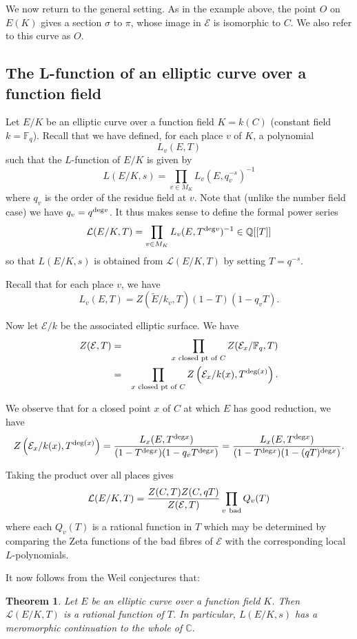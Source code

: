 \documentclass[12pt]{amsart}
\numberwithin{equation}{section}
\newtheorem{theorem}[equation]{Theorem}
\theoremstyle{remark}
\theoremstyle{definition}
\theoremstyle{definition}
\theoremstyle{definition}
\theoremstyle{definition}
\theoremstyle{definition}
\theoremstyle{definition}
\theoremstyle{definition}
\begin{document}
We now return to the general setting. As in the example above, the point $O$ on $E(K)$ gives a section $\sigma$ to $\pi$, whose image in $\mathcal{E}$ is isomorphic to  $C$. We also refer to this curve as $O$. 

\subsection{The L-function of an elliptic curve over a function field}

Let $E/K$ be an elliptic curve over a function field $K=k(C)$ (constant field $k=\mathbb{F}_q$). Recall that we have defined, for each place $v$ of $K$, a polynomial
\[L_v(E,T)\]
such that the $L$-function of $E/K$ is given by
\[L(E/K,s)=\prod_{v\in M_K}L_v(E,q_v^{-s})^{-1}\]
where $q_v$ is the order of the residue field at $v$. 
Note that (unlike the number field case) we have $q_v=q^{\textup{deg}v}$. It thus makes sense to define the formal power series
\[\mathcal{L}(E/K,T)=\prod_{v\in M_K}L_v(E,T^{\textup{deg}v})^{-1}\in \mathbb{Q}[[T]]\]
so that $L(E/K,s)$ is obtained from $\mathcal{L}(E/K,T)$ by setting $T=q^{-s}$. 

Recall that for each place $v$, we have
\[L_v(E,T)=Z(\tilde{E}/k_v,T)(1-T)(1-q_vT).\]

Now let $\mathcal{E}/k$ be the associated elliptic surface. We have
\begin{eqnarray*}
Z(\mathcal{E},T)&=&\prod_{x \textup{ closed pt of }C}Z(\mathcal{E}_x/\mathbb{F}_q,T)\\
&=&\prod_{x \textup{ closed pt of }C}Z\left(\mathcal{E}_x/k(x),T^{\textup{deg}(x)}\right).
\end{eqnarray*}

We observe that for a closed point $x$ of $C$ at which $E$ has good reduction, we have
\[Z\left(\mathcal{E}_x/k(x),T^{\textup{deg}(x)}\right)=\frac{L_x(E,T^{\textup{deg}x})}{(1-T^{\textup{deg}x})(1-q_vT^{\textup{deg}x})}=\frac{L_x(E,T^{\textup{deg}x})}{(1-T^{\textup{deg}x})(1-(qT)^{\textup{deg}x})}.\]

Taking the product over all places gives
\[\mathcal{L}(E/K,T)=\frac{Z(C,T)Z(C,qT)}{Z(\mathcal{E},T)}\prod_{v~\textup{bad}}Q_v(T)\]
where each $Q_v(T)$ is a rational function in $T$ which may be determined by comparing the Zeta functions of the bad fibres of $\mathcal{E}$ with the corresponding local $L$-polynomials. 

It now follows from the Weil conjectures that:

\begin{theorem}
Let $E$ be an elliptic curve over a function field $K$. Then $\mathcal{L}(E/K,T)$ is a rational function of $T$. In particular, $L(E/K,s)$ has a meromorphic continuation to the whole of $\mathbb{C}$.
\end{theorem}
\end{document}
